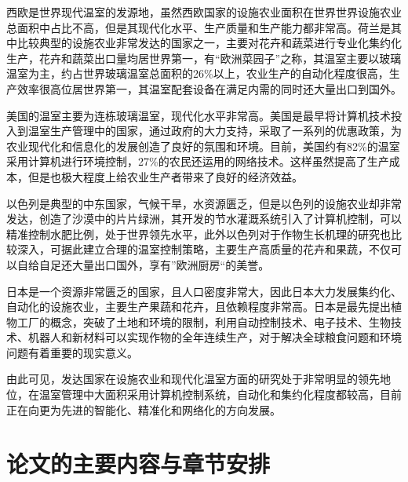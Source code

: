 	西欧是世界现代温室的发源地，虽然西欧国家的设施农业面积在世界世界设施农业总面积中占比不高，但是其现代化水平、生产质量和生产能力都非常高\supercite{GuoShirong2012}。荷兰是其中比较典型的设施农业非常发达的国家之一，主要对花卉和蔬菜进行专业化集约化生产，花卉和蔬菜出口量均居世界第一，有“欧洲菜园子”之称，其温室主要以玻璃温室为主，约占世界玻璃温室总面积的26\%以上\supercite{Watson,JiHong2007}，农业生产的自动化程度很高，生产效率很高位居世界第一\supercite{QinLiu2015}，其温室配套设备在满足内需的同时还大量出口到国外\supercite{Tavoletti2008Cutting}。
	
	美国的温室主要为连栋玻璃温室，现代化水平非常高。美国是最早将计算机技术投入到温室生产管理中的国家，通过政府的大力支持，采取了一系列的优惠政策，为农业现代化和信息化的发展创造了良好的氛围和环境。目前，美国约有82\%的温室采用计算机进行环境控制，27\%的农民还运用的网络技术\supercite{Kacira2011}。这样虽然提高了生产成本，但是也极大程度上给农业生产者带来了良好的经济效益\supercite{GuoShirong2012}。
	
	以色列是典型的中东国家，气候干旱，水资源匮乏，但是以色列的设施农业却非常发达，创造了沙漠中的片片绿洲，其开发的节水灌溉系统引入了计算机控制，可以精准控制水肥比例，处于世界领先水平，此外以色列对于作物生长机理的研究也比较深入，可据此建立合理的温室控制策略\supercite{GuoShirong2012,TangLibiao2003}，主要生产高质量的花卉和果蔬，不仅可以自给自足还大量出口国外，享有”欧洲厨房“的美誉\supercite{QinLiu2015}。
	
	日本是一个资源非常匮乏的国家，且人口密度非常大，因此日本大力发展集约化、自动化的设施农业，主要生产果蔬和花卉，且依赖程度非常高\supercite{YangChunjun2010}。日本是最先提出植物工厂的概念，突破了土地和环境的限制，利用自动控制技术、电子技术、生物技术、机器人和新材料可以实现作物的全年连续生产，对于解决全球粮食问题和环境问题有着重要的现实意义\supercite{HuYongguang2002}。
	
	由此可见，发达国家在设施农业和现代化温室方面的研究处于非常明显的领先地位，在温室管理中大面积采用计算机控制系统，自动化和集约化程度都较高，目前正在向更为先进的智能化、精准化和网络化的方向发展。
\section{论文的主要内容与章节安排}
